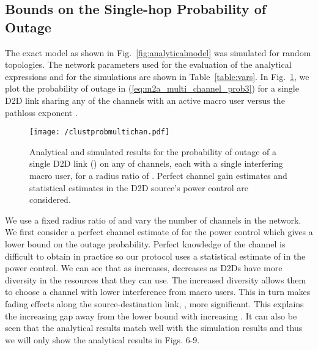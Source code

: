 \documentclass[10pt, final, journal, letterpaper,oneside, twocolumn]{IEEEtran}
\begin{document}
\subsection{Bounds on the Single-hop Probability of Outage}
The exact model as shown in Fig.~\ref{fig:analyticalmodel} was simulated for  random topologies.  The network parameters used for the evaluation of the analytical expressions and for the simulations are shown in Table~\ref{table:vars}.  In Fig.~\ref{fig:clustprobmultichan}, we plot the probability of outage in (\ref{eq:m2a_multi_channel_prob3}) for a single D2D link sharing any of the  channels with an active macro user versus the pathloss exponent .
\begin{figure}[htp]
\center
 \texttt{[image: /clustprobmultichan.pdf]}
  \caption[]{Analytical and simulated results for the probability of outage of a single D2D link () on any of  channels, each with a single interfering macro user, for a radius ratio of . Perfect channel gain estimates and statistical estimates in the D2D source's power control are considered. } 
  \label{fig:clustprobmultichan}
\end{figure}
We use a fixed radius ratio of  and vary the number of channels in the network.  We first consider a perfect channel estimate of  for the power control which gives a lower bound on the outage probability.  Perfect knowledge of the channel is difficult to obtain in practice so our protocol uses a statistical estimate of  in the power control.  We can see that as  increases,  decreases as D2Ds have more diversity in the resources that they can use.  The increased diversity allows them to choose a channel with lower interference from macro users.  This in turn makes fading effects along the source-destination link, , more significant.  This explains the increasing gap away from the lower bound with increasing .  It can also be seen that the analytical results match well with the simulation results and thus we will only show the analytical results in Figs. 6-9.  
\end{document}
